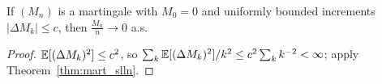 \begin{corollary}\label{cor:mart_slln_bounded}
\leanok
{}
If $(M_n)$ is a martingale with $M_0=0$ and uniformly bounded increments
$|\Delta M_k| \le c$, then $\frac{M_n}{n}\to 0$ a.s.
\end{corollary}

\begin{proof}\leanok
$\mathbb{E}[(\Delta M_k)^2]\le c^2$, so $\sum_k \mathbb{E}[(\Delta M_k)^2]/k^2 \le c^2\sum_k k^{-2}
< \infty$; apply Theorem~\ref{thm:mart_slln}.
\end{proof}
